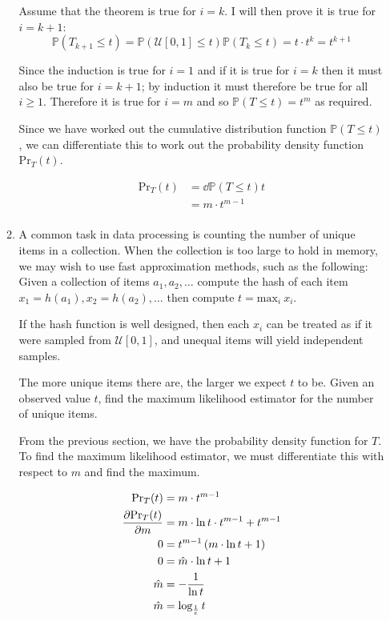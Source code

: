 \documentclass[10pt,\jkfside,a4paper]{article}
\begin{document}
\begin{enumerate}
\begin{enumerate}[label=(\alph*)]
Assume that the theorem is true for $i = k$. I will then prove it is true for
$i = k + 1$:
\[
\mathbb{P}(T_{k+1} \leq t) = \mathbb{P}(\mathcal{U}[0, 1] \leq t) \mathbb{P}
(T_{k} \leq t)= t\cdot t^k = t^{k+1}
\]

Since the induction is true for $i = 1$ and if it is true for $i=k$ then it
must also be true for $i=k+1$; by induction it must therefore be true for
all $i\geq 1$. Therefore it is true for $i=m$ and so
$\mathbb{P}(T \leq t) = t^m$ as required.

Since we have worked out the cumulative distribution function $\mathbb{P}(T
\leq t)$, we can differentiate this to work out the probability
density function $\text{Pr}_T(t)$.

\[
\begin{split}
\text{Pr}_T(t) &= \dd{\mathbb{P}(T \leq t)}{t} \\
&= m \cdot t^{m - 1} \\
\end{split}
\]

\item A common task in data processing is counting the number of unique
items in a collection. When the collection is too large to hold in memory,
we may wish to use fast approximation methods, such as the following: Given
a collection of items $a_1, a_2, \dots$ compute the hash of each item
$x_1 = h\left(a_1\right), x_2 = h\left( a_2 \right), \dots$ then compute
$t = \text{max}_i \ x_i$.

If the hash function is well designed, then each $x_i$ can be treated as if
it were sampled from $\mathcal{U}[0, 1]$, and unequal items will yield
independent samples.

The more unique items there are, the larger we expect $t$ to be. Given an
observed value $t$, find the maximum likelihood estimator for the number of
unique items.

From the previous section, we have the probability density function for $T$.
To find the maximum likelihood estimator, we must differentiate this with
respect to $m$ and find the maximum.

\[
\begin{split}
\text{Pr}_T(t) &= m \cdot t^{m-1} \\
\pdv{\text{Pr}_T(t)}{m} &= m\cdot \ln t \cdot t^{m-1} + t^{m-1} \\
0 &= t^{m-1}\left( m\cdot \ln t + 1 \right) \\
0 &= \hat{m}\cdot \ln t + 1 \\
\hat{m} &= -\frac{1}{\ln t} \\
\hat{m} &= \log_{\frac{1}{e}} t \\
\end{split}
\]


\end{enumerate}
\end{enumerate}
\end{document}
